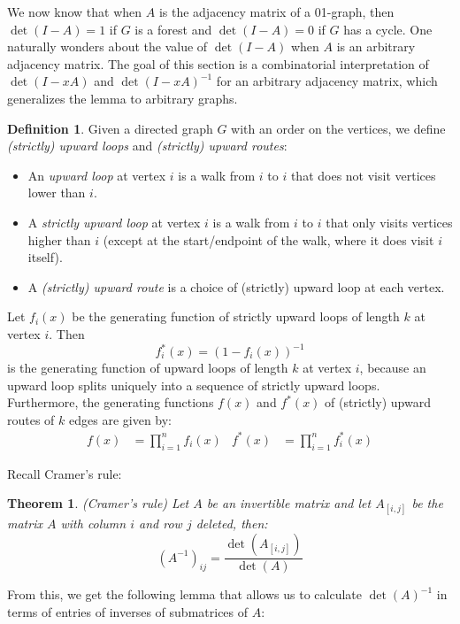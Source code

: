 \documentclass[a4paper, 11pt]{article}
\newtheorem{theorem}{Theorem}[section]
\theoremstyle{definition}
\newtheorem{definition}{Definition}[section]
\begin{document}
We now know that when $A$ is the adjacency matrix of a 01-graph, then $\det(I - A) = 1$ if $G$ is a forest and $\det(I - A) = 0$ if $G$ has a cycle. One naturally wonders about the value of $\det(I - A)$ when $A$ is an arbitrary adjacency matrix. The goal of this section is a combinatorial interpretation of $\det(I - xA)$ and $\det(I - xA)^{-1}$ for an arbitrary adjacency matrix, which generalizes the lemma to arbitrary graphs.

\begin{definition}
  Given a directed graph $G$ with an order on the vertices, we define \emph{(strictly) upward loops} and \emph{(strictly) upward routes}:
  \begin{itemize}
    \item An \emph{upward loop} at vertex $i$ is a walk from $i$ to $i$ that does not visit vertices lower than $i$.
    \item A \emph{strictly upward loop} at vertex $i$ is a walk from $i$ to $i$ that only visits vertices higher than $i$ (except at the start/endpoint of the walk, where it does visit $i$ itself).
    \item A \emph{(strictly) upward route} is a choice of (strictly) upward loop at each vertex.
  \end{itemize}
  Let $f_i(x)$ be the generating function of strictly upward loops of length $k$ at vertex $i$. Then \[ f^{*}_i(x) = (1 - f_i(x))^{-1} \] is the generating function of upward loops of length $k$ at vertex $i$, because an upward loop splits uniquely into a sequence of strictly upward loops. Furthermore, the generating functions $f(x)$ and $f^{*}(x)$ of (strictly) upward routes of $k$ edges are given by:
  \begin{align*}
    f(x) &= \prod_{i=1}^n f_i(x) &
    f^{*}(x) &= \prod_{i=1}^n f^{*}_i(x)
  \end{align*}
\end{definition}

Recall Cramer's rule:
\begin{theorem} (Cramer's rule)
  Let $A$ be an invertible matrix and let $A_{[i,j]}$ be the matrix $A$ with column $i$ and row $j$ deleted, then:
  \[ (A^{-1})_{ij} = \frac{\det(A_{[i,j]})}{\det(A)} \]
\end{theorem}

From this, we get the following lemma that allows us to calculate $\det(A)^{-1}$ in terms of entries of inverses of submatrices of $A$:
\end{document}
